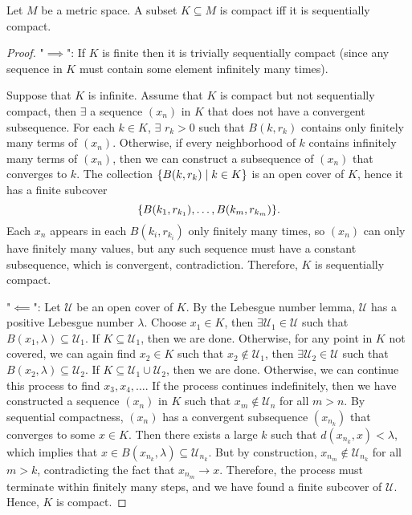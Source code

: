 \begin{thm}
    Let $M$ be a metric space. A subset $K\subseteq M$ is compact iff it is sequentially compact.
    \begin{proof}
        "$\implies$": If $K$ is finite then it is trivially sequentially compact (since any sequence in $K$ must contain some element infinitely many times). 
        
        Suppose that $K$ is infinite. Assume that $K$ is compact but not sequentially compact, then $\exists$ a sequence $(x_n)$ in $K$ that does not have a convergent subsequence. For each $k\in K$, $\exists$ $r_k > 0$ such that $B(k, r_k)$ contains only finitely many terms of $(x_n)$. Otherwise, if every neighborhood of $k$ contains infinitely many terms of $(x_n)$, then we can construct a subsequence of $(x_n)$ that converges to $k$. The collection ${\left\{{B(k, r_k) \mid k\in K}\right\}}$ is an open cover of $K$, hence it has a finite subcover
        \[
        {\left\{{B(k_1, r_{k_1}), \ldots, B(k_m, r_{k_m})}\right\}}.
        \]
        Each $x_n$ appears in each $B(k_i, r_{k_i})$ only finitely many times, so $(x_n)$ can only have finitely many values, but any such sequence must have a constant subsequence, which is convergent, contradiction. Therefore, $K$ is sequentially compact.

        "$\impliedby$": Let $\mathcal U$ be an open cover of $K$. By the Lebesgue number lemma, $\mathcal U$ has a positive Lebesgue number $\lambda$. Choose $x_1 \in K$, then $\exists \mathcal U_1 \in \mathcal U$ such that $B(x_1, \lambda) \subseteq \mathcal U_1$. If $K \subseteq \mathcal U_1$, then we are done. Otherwise, for any point in $K$ not covered, we can again find $x_2 \in K$ such that $x_2 \notin \mathcal U_1$, then $\exists \mathcal U_2 \in \mathcal U$ such that $B(x_2, \lambda) \subseteq \mathcal U_2$. If $K \subseteq \mathcal U_1 \cup \mathcal U_2$, then we are done. Otherwise, we can continue this process to find $x_3, x_4, \ldots$. If the process continues indefinitely, then we have constructed a sequence $(x_n)$ in $K$ such that $x_m \notin \mathcal U_n$ for all $m > n$. By sequential compactness, $(x_n)$ has a convergent subsequence $(x_{n_k})$ that converges to some $x\in K$. Then there exists a large $k$ such that $d(x_{n_k}, x) < \lambda$, which implies that $x\in B(x_{n_k}, \lambda)\subseteq \mathcal U_{n_k}$. But by construction, $x_{n_m} \notin \mathcal U_{n_k}$ for all $m > k$, contradicting the fact that $x_{n_m} \to x$. Therefore, the process must terminate within finitely many steps, and we have found a finite subcover of $\mathcal U$. Hence, $K$ is compact.
    \end{proof}
\end{thm}

